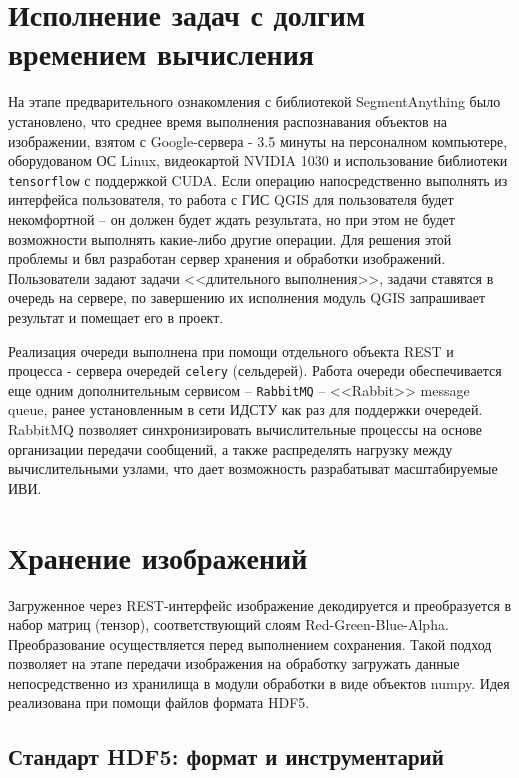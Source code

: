 \documentclass[732,fontsize=14pt,final]{studrep}
\begin{document}
\section{Исполнение задач с долгим времением вычисления}

На этапе предварительного ознакомления с библиотекой SegmentAnything было установлено, что среднее время выполнения распознавания объектов на изображении, взятом с Google-сервера - 3.5 минуты на персоналном компьютере, оборудованом ОС Linux, видеокартой NVIDIA 1030 и использование библиотеки \verb|tensorflow| с поддержкой CUDA. Если операцию напосредственно выполнять из интерфейса пользователя, то работа с ГИС QGIS для пользователя будет некомфортной -- он должен будет ждать результата, но при этом не будет возможности выполнять какие-либо другие операции. Для решения этой проблемы и бвл разработан сервер хранения и обработки изображений. Пользователи задают задачи <<длительного выполнения>>, задачи ставятся в очередь на сервере, по завершению их исполнения модуль QGIS запрашивает результат и помещает его в проект.

Реализация очереди выполнена при помощи отдельного объекта REST и процесса - сервера очередей \verb|celery| (сельдерей). Работа очереди обеспечивается еще одним дополнительным сервисом -- \verb|RabbitMQ| -- <<Rabbit>> message queue, ранее установленным в сети ИДСТУ как раз для поддержки очередей. RabbitMQ позволяет синхронизировать вычислительные процессы на основе организации передачи сообщений, а также распределять нагрузку между вычислительными узлами, что дает возможность разрабатыват масштабируемые ИВИ. 

\section{Хранение изображений}

Загруженное через REST-интерфейс изображение декодируется и преобразуется в набор матриц (тензор), соответствующий слоям Red-Green-Blue-Alpha. Преобразование осуществляется перед выполнением сохранения. Такой подход позволяет на этапе передачи изображения на обработку загружать данные непосредственно из хранилища в модули обработки в виде объектов numpy. Идея реализована при помощи файлов формата HDF5.

\subsection{Стандарт HDF5: формат и инструментарий}
\end{document}
